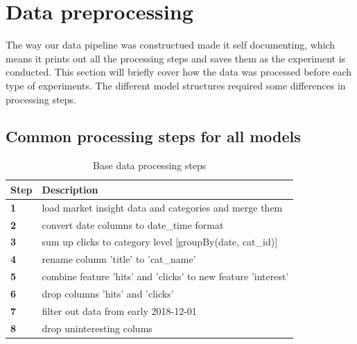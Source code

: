 \section{Data preprocessing}
\label{section:Data:Preprocessing}
The way our data pipeline was constructued made it self documenting,
which means it prints out all the processing steps and saves them as the
experiment is conducted. This section will briefly cover how the data was processed
before each type of experiments.
The different model structures required some differences in processing steps.

\subsection{Common processing steps for all models}

\begin{table}[h]
  \centering
  \caption{Base data processing steps}
  \label{table:base_data_processing_steps}
  \begin{tabular}{ll}
    \toprule
    Step       & Description                                                   \\
    \midrule
    \textbf{1} & load market insight data and categories and merge them        \\
    \textbf{2} & convert date columns to date\_time format                     \\
    \textbf{3} & sum up clicks to category level [groupBy(date, cat\_id)]      \\
    \textbf{4} & rename column 'title' to 'cat\_name'                          \\
    \textbf{5} & combine feature 'hits' and 'clicks' to new feature 'interest' \\
    \textbf{6} & drop columns 'hits' and 'clicks'                              \\
    \textbf{7} & filter out data from early 2018-12-01                         \\
    \textbf{8} & drop uninteresting colums                                     \\
    \bottomrule
  \end{tabular}
\end{table}


